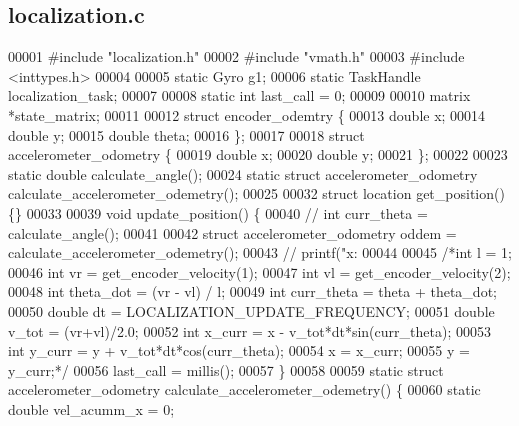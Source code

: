 \subsection{localization.\+c}
\label{localization_8c_source}

\begin{DoxyCode}
00001 \textcolor{preprocessor}{#include "localization.h"}
00002 \textcolor{preprocessor}{#include "vmath.h"}
00003 \textcolor{preprocessor}{#include <inttypes.h>}
00004 
00005 \textcolor{keyword}{static} Gyro g1;
00006 \textcolor{keyword}{static} TaskHandle localization_task;
00007 
00008 \textcolor{keyword}{static} \textcolor{keywordtype}{int} last_call = 0;
00009 
00010 matrix *state_matrix;
00011 
00012 \textcolor{keyword}{struct }encoder_odemtry \{
00013   \textcolor{keywordtype}{double} x;
00014   \textcolor{keywordtype}{double} y;
00015   \textcolor{keywordtype}{double} theta;
00016 \};
00017 
00018 \textcolor{keyword}{struct }accelerometer_odometry \{
00019   \textcolor{keywordtype}{double} x;
00020   \textcolor{keywordtype}{double} y;
00021 \};
00022 
00023 \textcolor{keyword}{static} \textcolor{keywordtype}{double} calculate_angle();
00024 \textcolor{keyword}{static} \textcolor{keyword}{struct }accelerometer_odometry calculate_accelerometer_odemetry();
00025 
00032 \textcolor{keyword}{struct }location get_position() \{\}
00033 
00039 \textcolor{keywordtype}{void} update_position() \{
00040   \textcolor{comment}{// int curr\_theta = calculate\_angle();}
00041 
00042   \textcolor{keyword}{struct }accelerometer_odometry oddem = calculate_accelerometer_odemetry();
00043   \textcolor{comment}{// printf("x: %
00044 
00045   \textcolor{comment}{/*int l = 1;}
00046 \textcolor{comment}{  int vr = get\_encoder\_velocity(1);}
00047 \textcolor{comment}{  int vl = get\_encoder\_velocity(2);}
00048 \textcolor{comment}{  int theta\_dot = (vr - vl) / l;}
00049 \textcolor{comment}{  int curr\_theta = theta + theta\_dot;}
00050 \textcolor{comment}{  double dt = LOCALIZATION\_UPDATE\_FREQUENCY;}
00051 \textcolor{comment}{  double v\_tot = (vr+vl)/2.0;}
00052 \textcolor{comment}{  int x\_curr = x - v\_tot*dt*sin(curr\_theta);}
00053 \textcolor{comment}{  int y\_curr = y + v\_tot*dt*cos(curr\_theta);}
00054 \textcolor{comment}{  x = x\_curr;}
00055 \textcolor{comment}{  y = y\_curr;*/}
00056   last_call = millis();
00057 \}
00058 
00059 \textcolor{keyword}{static} \textcolor{keyword}{struct }accelerometer_odometry calculate_accelerometer_odemetry() \{
00060   \textcolor{keyword}{static} \textcolor{keywordtype}{double} vel\_acumm\_x = 0;
}
\end{DoxyCode}

